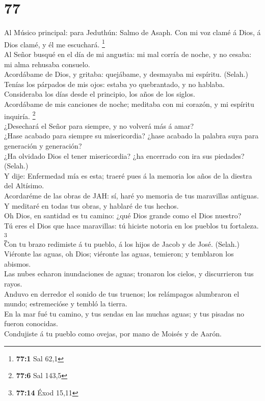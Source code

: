 \hypertarget{section-76}{%
\section{77}\label{section-76}}

 Al Músico principal: para Jeduthún: Salmo de Asaph. Con
mi voz clamé á Dios, á Dios clamé, y él me escuchará. \footnote{\textbf{77:1}
  Sal 62,1}\\
 Al Señor busqué en el día de mi angustia: mi mal corría
de noche, y no cesaba: mi alma rehusaba consuelo.\\
 Acordábame de Dios, y gritaba: quejábame, y desmayaba mi
espíritu. (Selah.)\\
 Tenías los párpados de mis ojos: estaba yo quebrantado, y
no hablaba.\\
 Consideraba los días desde el principio, los años de los
siglos.\\
 Acordábame de mis canciones de noche; meditaba con mi
corazón, y mi espíritu inquiría. \footnote{\textbf{77:6} Sal 143,5}\\
 ¿Desechará el Señor para siempre, y no volverá más á
amar?\\
 ¿Hase acabado para siempre su misericordia? ¿hase acabado
la palabra suya para generación y generación?\\
 ¿Ha olvidado Dios el tener misericordia? ¿ha encerrado
con ira sus piedades? (Selah.)\\
 Y dije: Enfermedad mía es esta; traeré pues á la memoria
los años de la diestra del Altísimo.\\
 Acordaréme de las obras de JAH: sí, haré yo memoria de
tus maravillas antiguas.\\
 Y meditaré en todas tus obras, y hablaré de tus
hechos.\\
 Oh Dios, en santidad es tu camino: ¿qué Dios grande como
el Dios nuestro?\\
 Tú eres el Dios que hace maravillas: tú hiciste notoria
en los pueblos tu fortaleza. \footnote{\textbf{77:14} Éxod 15,11}\\
 Con tu brazo redimiste á tu pueblo, á los hijos de Jacob
y de José. (Selah.)\\
 Viéronte las aguas, oh Dios; viéronte las aguas,
temieron; y temblaron los abismos.\\
 Las nubes echaron inundaciones de aguas; tronaron los
cielos, y discurrieron tus rayos.\\
 Anduvo en derredor el sonido de tus truenos; los
relámpagos alumbraron el mundo; estremecióse y tembló la tierra.\\
 En la mar fué tu camino, y tus sendas en las muchas
aguas; y tus pisadas no fueron conocidas.\\
 Condujiste á tu pueblo como ovejas, por mano de Moisés y
de Aarón.

